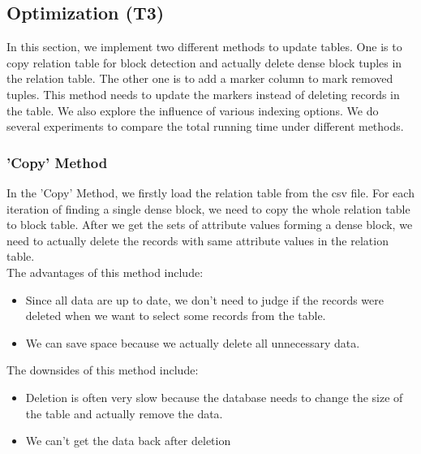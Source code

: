 \subsection{Optimization (T3)}
In this section, we implement two different methods to update tables. One is to copy relation table for block detection and actually delete dense block tuples in the relation table. The other one is to add a marker column to mark removed tuples. This method needs to update the markers instead of deleting records in the table. We also explore the influence of various indexing options. We do several experiments to compare the total running time under different methods.
\subsubsection{'Copy' Method}
In the 'Copy' Method, we firstly load the relation table from the csv file. For each iteration of finding a single dense block, we need to copy the whole relation table to block table. After we get the sets of attribute values forming a dense block, we need to actually delete the records with same attribute values in the relation table. \\
The advantages of this method include: 
\begin{itemize}
    \item Since all data are up to date, we don't need to judge if the records were deleted when we want to select some records from the table.
    \item We can save space because we actually delete all unnecessary data.
\end{itemize}
The downsides of this method include:
\begin{itemize}
    \item Deletion is often very slow because the database needs to change the size of the table and actually remove the data.
    \item We can't get the data back after deletion
\end{itemize}
 
